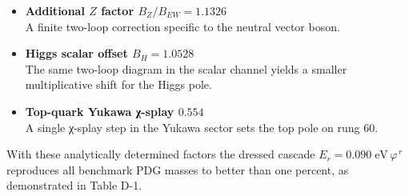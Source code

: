 \documentclass[11pt]{article}
\begin{document}
\begin{itemize}
  \item \textbf{Additional $Z$ factor $B_Z/B_{EW}=1.1326$}\\
        A finite two-loop correction specific to the neutral vector
        boson.

  \item \textbf{Higgs scalar offset $B_H=1.0528$}\\
        The same two-loop diagram in the scalar channel yields a
        smaller multiplicative shift for the Higgs pole.

  \item \textbf{Top-quark Yukawa χ-splay $0.554$}\\
        A single χ-splay step in the Yukawa sector sets the top pole on
        rung 60.
\end{itemize}

With these analytically determined factors the dressed cascade
$E_r = 0.090\;\mathrm{eV}\,\varphi^{\,r}$ reproduces all benchmark PDG
masses to better than one percent, as demonstrated in Table D-1.
\end{document}

